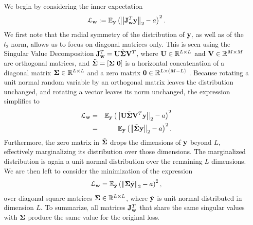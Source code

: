 We begin by considering the inner expectation
\begin{equation*}
	\mathcal{L}_{{\bf w}} := \mathbb{E}_{\bf y} \left(\left\lVert {\bf J}^T_{\bf w} {\bf y}\right\rVert_2 - a\right)^2.
\end{equation*}
We first note that the radial symmetry of the distribution of ${\bf y}$, as well as of the $l_2$ norm, allows us to focus on diagonal matrices only. This is seen using the Singular Value Decomposition ${\bf J}^T_{\bf w} = \mathbf{U}\tilde{{\bf \Sigma}}\mathbf{V}^T$, where $\mathbf{U} \in \mathbb{R}^{L \times L}$ and $\mathbf{V} \in \mathbb{R}^{M \times M}$ are orthogonal matrices, and $\tilde {{\bf \Sigma}} = [{\bf \Sigma} ~ \mathbf{0}]$ is a horizontal concatenation of a diagonal matrix ${\bf \Sigma} \in \mathbb{R}^{L \times L}$ and a zero matrix $\mathbf{0} \in \mathbb{R}^{L \times (M-L)}$ \cite{Golub2013}. Because rotating a unit normal random variable by an orthogonal matrix leaves the distribution unchanged, and rotating a vector leaves its norm unchanged, the expression simplifies to
\begin{eqnarray*}
	\mathcal{L}_{{\bf w}} &=& \mathbb{E}_{\bf y} \left(\left\lVert \mathbf{U}\tilde{{\bf \Sigma}}\mathbf{V}^T {\bf y}\right\rVert_2 - a\right)^2 
	\\
	&=& \mathbb{E}_{\bf y} \left(\left\lVert \tilde{{\bf \Sigma}} {\bf y}\right\rVert_2 - a\right)^2.
\end{eqnarray*}
Furthermore, the zero matrix in $\tilde {{\bf \Sigma}}$ %
drops the dimensions of ${\bf y}$ beyond $L$, effectively marginalizing its distribution over those dimensions. The marginalized distribution is again a unit normal distribution over the remaining $L$ dimensions. We are then left to consider the minimization of the expression
\begin{equation*}
	\mathcal{L}_{{\bf w}} = \mathbb{E}_{\tilde {\bf y}} \left(\left\lVert {\bf \Sigma} \tilde {\bf y}\right\rVert_2 - a\right)^2,
\end{equation*}
over diagonal square matrices ${\bf \Sigma} \in \mathbb{R}^{L \times L}$, where $\tilde {\bf y}$ is unit normal distributed in dimension $L$. To summarize, all matrices ${\bf J}^T_{\bf w}$ that share the same singular values with ${\bf \Sigma}$ produce the same value for the original loss.

